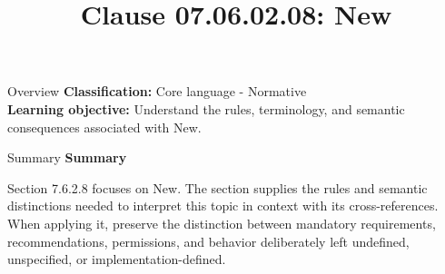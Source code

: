 \documentclass[10pt,letterpaper]{article}
\title{Clause 07.06.02.08: New}
\author{}
\date{}
\begin{document}
\maketitle
\begin{CornellOverviewBox}{Overview}
\textbf{Classification:} Core language - Normative\\[2pt]
\textbf{Learning objective:} Understand the rules, terminology, and semantic consequences associated with New.
\end{CornellOverviewBox}\begin{CornellSummaryBox}{Summary}
{\sffamily\bfseries\color{Accent} Summary}\par\vspace{3pt}Section 7.6.2.8 focuses on New. The section supplies the rules and semantic distinctions needed to interpret this topic in context with its cross-references. When applying it, preserve the distinction between mandatory requirements, recommendations, permissions, and behavior deliberately left undefined, unspecified, or implementation-defined.
\end{CornellSummaryBox}
\end{document}
